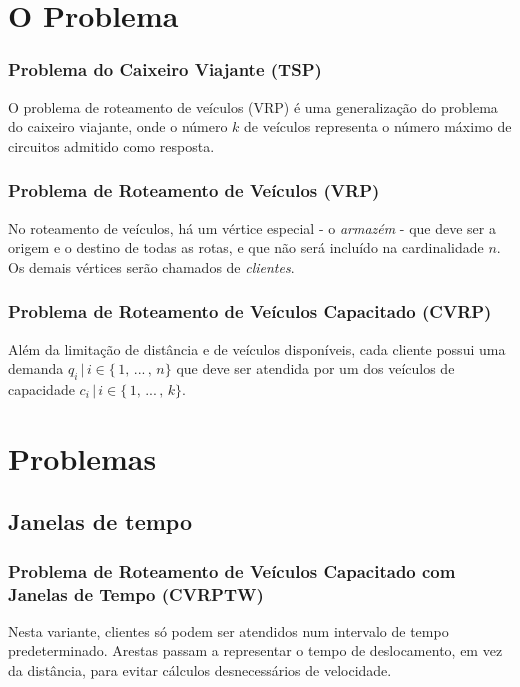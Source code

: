 \documentclass{beamer}
\begin{document}
\section{O Problema} %

\begin{frame} %
    \frametitle{Problema do Caixeiro Viajante (TSP)}

    O problema de roteamento de veículos (VRP) é uma generalização do problema do caixeiro viajante, onde o número \(k\) de veículos representa o número máximo de circuitos admitido como resposta.

\end{frame}


\begin{frame} %
    \frametitle{Problema de Roteamento de Veículos (VRP)}

    No roteamento de veículos, há um vértice especial - o \emph{armazém} - que deve ser a origem e o destino de todas as rotas, e que não será incluído na cardinalidade \(n\). Os demais vértices serão chamados de \emph{clientes}.

\end{frame}


\begin{frame} %
    \frametitle{Problema de Roteamento de Veículos Capacitado (CVRP)}

    Além da limitação de distância e de veículos disponíveis, cada cliente possui uma demanda \(q_{i} \, | \, i \in \{ \, 1, \, ... \, , \, n\} \) que deve ser atendida por um dos veículos de capacidade \(c_{i} \, | \, i \in \{ \, 1, \, ... \, , \, k\} \).

\end{frame}

\section{Problemas}

\subsection{Janelas de tempo}

\begin{frame} %
    \frametitle{Problema de Roteamento de Veículos Capacitado com Janelas de Tempo (CVRPTW)}

    Nesta variante, clientes só podem ser atendidos num intervalo de tempo predeterminado. Arestas passam a representar o tempo de deslocamento, em vez da distância, para evitar cálculos desnecessários de velocidade. 


\end{frame}
\end{document}
